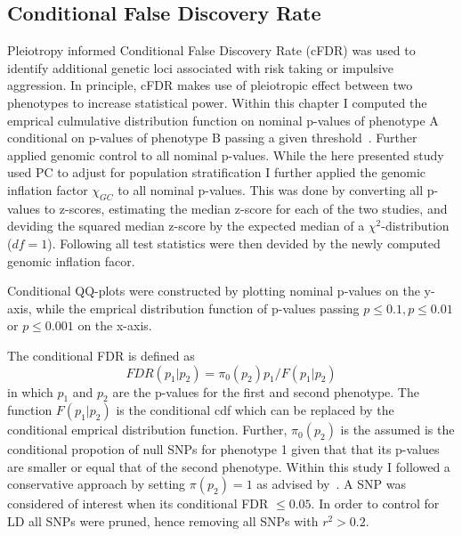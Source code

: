 \subsection{Conditional False Discovery Rate}
\label{sub:conditional_false_discovery_rate}

Pleiotropy informed Conditional False Discovery Rate (cFDR) was used to identify additional genetic loci associated with risk taking or impulsive aggression. 
In principle, cFDR makes use of pleiotropic effect between two phenotypes to increase statistical power.
Within this chapter I computed the emprical culmulative distribution function on nominal p-values of phenotype A conditional on p-values of phenotype B passing a given threshold~\cite{Andreassen2013}.
Further applied genomic control to all nominal p-values.
While the here presented study used PC to adjust for population stratification I further applied the genomic inflation factor $\chi_{GC}$ to all nominal p-values.
This was done by converting all p-values to z-scores, estimating the median z-score for each of the two studies, and deviding the squared median z-score by the expected median of a $\chi^2$-distribution ($df=1$).
Following all test statistics were then devided by the newly computed genomic inflation facor. 

Conditional QQ-plots were constructed by plotting nominal p-values on the y-axis, while the emprical distribution function of p-values passing $p\leq0.1, p\leq 0.01$ or $ p\leq 0.001$ on the x-axis.

The conditional FDR is defined as~\cite{Andreassen2013}
\begin{equation}
  FDR(p_1|p_2)=\pi_0(p_2)p_1/F(p_1|p_2)
\end{equation}
in which $p_1$ and $p_2$ are the p-values for the first and second phenotype.
The function $F(p_1|p_2)$ is the conditional cdf which can be replaced by the conditional emprical distribution function.
Further, $\pi_0(p_2)$ is the assumed is the conditional propotion of null SNPs for phenotype 1 given that that its p-values are smaller or equal that of the second phenotype.
Within this study I followed a conservative approach by setting $\pi(p_2)=1$ as advised by~\citet{Andreassen2013}.
A SNP was considered of interest when its conditional FDR $\leq 0.05$.
In order to control for LD all SNPs were pruned, hence removing all SNPs with $r^2 > 0.2$.




